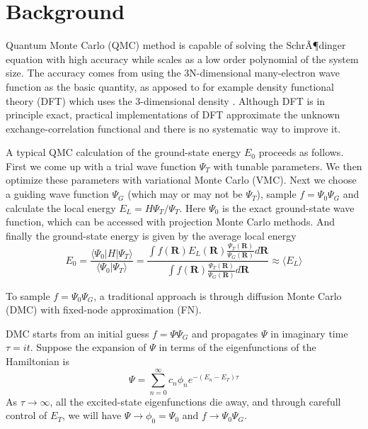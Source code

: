 \documentclass[aps,prl,reprint,groupedaddress]{revtex4-1}
\begin{document}
\section{\label{sec:background}Background}
Quantum Monte Carlo (QMC) method is capable of solving the SchrÃ¶dinger equation with high accuracy while scales as a low order polynomial of the system size.
The accuracy comes from using the 3N-dimensional many-electron wave function as the basic quantity, as apposed to for example density functional theory (DFT) which uses the 3-dimensional density \cite{kohn1996density}.  Although DFT is in principle exact, practical implementations of DFT approximate the unknown exchange-correlation functional and there is no systematic way to improve it.

A typical QMC calculation of the ground-state energy $E_0$ proceeds as follows. First we come up with a trial wave function $\Psi_T$ with tunable parameters.
We then optimize these parameters with variational Monte Carlo (VMC).
Next we choose a guiding wave function $\Psi_G$ (which may or may not be $\Psi_T$), sample $f = \Psi_0\Psi_G$ and calculate the local energy $E_L = H\Psi_T/\Psi_T$.
Here $\Psi_0$ is the exact ground-state wave function, which can be accessed with projection Monte Carlo methods.
And finally the ground-state energy is given by the average local energy
\begin{equation}
E_0 = \frac{\langle \Psi_0|H|\Psi_T \rangle}{\langle \Psi_0|\Psi_T \rangle}
= \frac{\int f(\mathbf{R})E_L(\mathbf{R})\frac{\Psi_T(\mathbf{R})}{\Psi_G(\mathbf{R})}d\mathbf{R}}{\int f(\mathbf{R})\frac{\Psi_T(\mathbf{R})}{\Psi_G(\mathbf{R})}d\mathbf{R}} \approx \langle E_L \rangle
\end{equation}

To sample $f = \Psi_0\Psi_G$, a traditional approach is through diffusion Monte Carlo (DMC) with fixed-node approximation (FN).

DMC starts from an initial guess $f = \Psi\Psi_G$ and propagates $\Psi$ in imaginary time $\tau=it$.
Suppose the expansion of $\Psi$ in terms of the eigenfunctions of the Hamiltonian is
\begin{equation}
\Psi = \sum_{n=0}^{\infty}c_n\phi_ne^{-(E_n-E_T)\tau}
\end{equation}
As $\tau\to\infty$, all the excited-state eigenfunctions die away, and through carefull control of $E_T$, we will have $\Psi\to\phi_0=\Psi_0$ and $f\to\Psi_0\Psi_G$.
\end{document}
